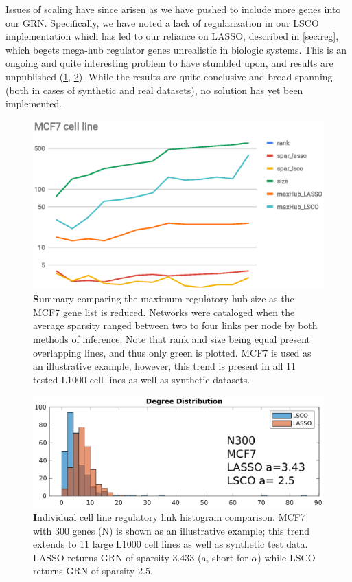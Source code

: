 Issues of scaling have since arisen as we have pushed to include more genes into our GRN. Specifically, we have noted a lack of regularization in our LSCO implementation which has led to our reliance on LASSO, described in \cref{sec:reg}, which begets mega-hub regulator genes unrealistic in biologic systems. This is an ongoing and quite interesting problem to have stumbled upon, and results are unpublished (\cref{fig:scaling}, \cref{fig:hubiness}). While the results are quite conclusive and broad-spanning (both in cases of synthetic and real datasets), no solution has yet been implemented.
\begin{figure}[H]
\centering
\includegraphics[width=.75\linewidth]{3/MCF7_cell_line.eps}
\caption{{\textbf Summary comparing the maximum regulatory hub size as the MCF7 gene list is reduced.} Networks were cataloged when the average sparsity ranged between two to four links per node by both methods of inference. Note that rank and size being equal present overlapping lines, and thus only green is plotted. MCF7 is used as an illustrative example, however, this trend is present in all 11 tested L1000 cell lines as well as synthetic datasets.
}
\label{fig:scaling}
\end{figure}

\begin{figure}[H]
\centering
\includegraphics[width=.75\linewidth]{3/hubineess.eps}
\caption{{\textbf Individual cell line regulatory link histogram comparison.} MCF7 with 300 genes (N) is shown as an illustrative example; this trend extends to 11 large L1000 cell lines as well as synthetic test data. LASSO returns GRN of sparsity 3.433 (a, short for $\alpha$) while LSCO returns GRN of sparsity 2.5.
}
\label{fig:hubiness}
\end{figure}




